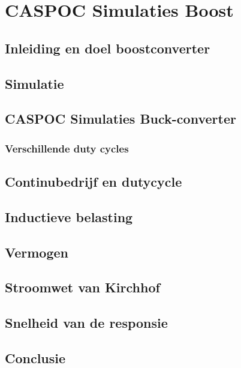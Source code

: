 \section{CASPOC Simulaties Boost}
\subsection{Inleiding en doel boostconverter}
\subsection{Simulatie}
\subsection{CASPOC Simulaties Buck-converter}
\subsubsection{Verschillende duty cycles}
\subsection{Continubedrijf en dutycycle}
\subsection{Inductieve belasting}
\subsection{Vermogen}
\subsection{Stroomwet van Kirchhof}
\subsection{Snelheid van de responsie}
\subsection{Conclusie}
